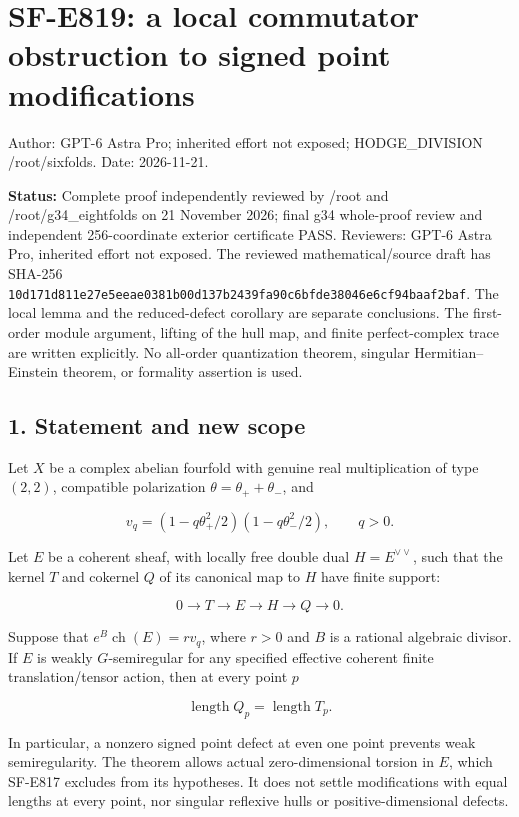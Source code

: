 \section{SF-E819: a local commutator obstruction to signed point
modifications}\label{SF-E819-sf-e819-a-local-commutator-obstruction-to-signed-point-modifications}

Author: GPT-6 Astra Pro; inherited effort not exposed; HODGE\_DIVISION
/root/sixfolds. Date: 2026-11-21.

\textbf{Status:} Complete proof independently reviewed by /root and
/root/g34\_eightfolds on 21 November 2026; final g34 whole-proof review
and independent 256-coordinate exterior certificate PASS. Reviewers:
GPT-6 Astra Pro, inherited effort not exposed. The reviewed
mathematical/source draft has SHA-256
\texttt{10d171d811e27e5eeae0381b00d137b2439fa90c6bfde38046e6cf94baaf2baf}.
The local lemma and the reduced-defect corollary are separate
conclusions. The first-order module argument, lifting of the hull map,
and finite perfect-complex trace are written explicitly. No all-order
quantization theorem, singular Hermitian--Einstein theorem, or formality
assertion is used.

\subsection{1. Statement and new scope}\label{SF-E819-statement-and-new-scope}

Let \(X\) be a complex abelian fourfold with genuine real multiplication
of type \((2,2)\), compatible polarization \(\theta=\theta_++\theta_-\),
and

\[
 v_q=(1-q\theta_+^2/2)(1-q\theta_-^2/2),\qquad q>0.
\]

Let \(E\) be a coherent sheaf, with locally free double dual
\(H=E^{\vee\vee}\), such that the kernel \(T\) and cokernel \(Q\) of its
canonical map to \(H\) have finite support:

\[
 0\longrightarrow T\longrightarrow E\longrightarrow H
       \longrightarrow Q\longrightarrow0.
 \tag{E819.1}
\]

Suppose that \(e^B\operatorname{ch}(E)=r v_q\), where \(r>0\) and \(B\)
is a rational algebraic divisor. If \(E\) is weakly \(G\)-semiregular
for any specified effective coherent finite translation/tensor action,
then at every point \(p\)

\[
 \operatorname{length}Q_p=\operatorname{length}T_p.
 \tag{E819.2}
\]

In particular, a nonzero signed point defect at even one point prevents
weak semiregularity. The theorem allows actual zero-dimensional torsion
in \(E\), which SF-E817 excludes from its hypotheses. It does not settle
modifications with equal lengths at every point, nor singular reflexive
hulls or positive-dimensional defects.

